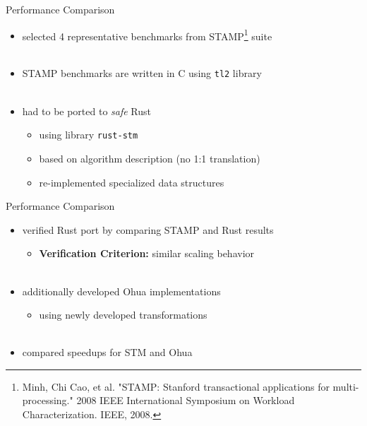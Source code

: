 \documentclass[aspectratio=169, usenames, dvipsnames]{beamer}
\begin{document}
\begin{frame}{Performance Comparison}
    \begin{itemize}
        \item selected 4 representative benchmarks from STAMP\footnote[3]{Minh, Chi Cao, et al. "STAMP: Stanford transactional applications for multi-processing." 2008 IEEE International Symposium on Workload Characterization. IEEE, 2008.} suite\\ \
        \item<2-> STAMP benchmarks are written in C using \texttt{tl2} library\\ \
        \item<3-> had to be ported to \emph{safe} Rust
            \begin{itemize}
                \item<3-> using library \texttt{rust-stm}
                \item<4-> based on algorithm description (no 1:1 translation)
                \item<5-> re-implemented specialized data structures
            \end{itemize}
    \end{itemize}
\end{frame}

\begin{frame}{Performance Comparison}
    \begin{itemize}
        \item verified Rust port by comparing STAMP and Rust results
            \begin{itemize}
                \item<2-> \textbf{Verification Criterion:} similar scaling behavior\\ \
            \end{itemize}
        \item<3-> additionally developed Ohua implementations
            \begin{itemize}
                \item<3-> using newly developed transformations\\ \
            \end{itemize}
        \item<4-> compared speedups for STM and Ohua
    \end{itemize}
\end{frame}
\end{document}
